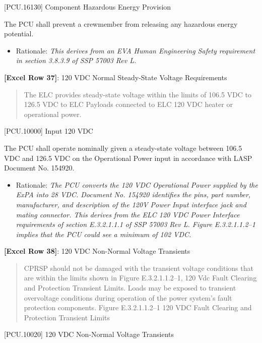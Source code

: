[PCU.16130] Component Hazardous Energy Provision

The PCU shall prevent a crewmember from releasing any hazardous energy potential.

\begin{itemize}
\item{} Rationale: \emph{This derives from an EVA Human Engineering Safety requirement in section 3.8.3.9 of SSP 57003 Rev L.}

\end{itemize}

\textbf{[Excel Row 37]}: 120 VDC Normal Steady-State Voltage Requirements

\begin{quote}
The ELC provides steady-state voltage within the limits of 106.5 VDC to 126.5 VDC to ELC Payloads connected to ELC 120 VDC heater or operational power.
\end{quote}

[PCU.10000] Input 120 VDC

The PCU shall operate nominally given a steady-state voltage between 106.5 VDC and 126.5 VDC on the Operational Power input in accordance with LASP Document No. 154920.

\begin{itemize}
\item{} Rationale: \emph{The PCU converts the 120 VDC Operational Power supplied by the ExPA into 28 VDC. Document No. 154920 identifies the pins, part number, manufacturer, and description of the 120V Power Input interface jack and mating connector. This derives from the ELC 120 VDC Power Interface requirements of section E.3.2.1.1.1 of SSP 57003 Rev L. Figure E.3.2.1.1.2--1 implies that the PCU could see a minimum of 102 VDC.}

\end{itemize}

\textbf{[Excel Row 38]}: 120 VDC Non-Normal Voltage Transients

\begin{quote}
CPRSP should not be damaged with the transient voltage conditions that are within the limits shown in Figure E.3.2.1.1.2--1, 120 Vdc Fault Clearing and Protection Transient Limits. Loads may be exposed to transient overvoltage conditions during operation of the power system’s fault protection components.
Figure E.3.2.1.1.2--1 120 VDC Fault Clearing and Protection Transient Limits
\end{quote}

[PCU.10020] 120 VDC Non-Normal Voltage Transients

